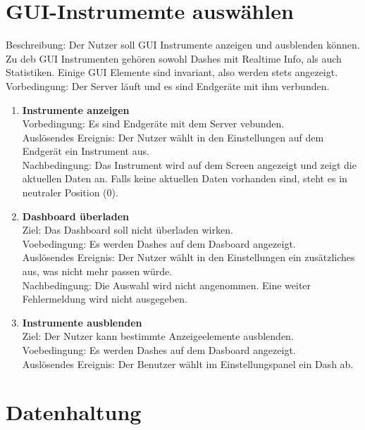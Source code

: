 \documentclass[pflichtenheft.tex]{subfiles}
\begin{document}
	\section{\textbf{GUI-Instrumemte auswählen}}
	Beschreibung: Der Nutzer soll GUI Instrumente anzeigen und ausblenden können. Zu deb GUI Instrumenten gehören sowohl Dashes mit Realtime Info, als auch Statistiken. Einige GUI Elemente sind invariant, also werden stets angezeigt. \\Vorbedingung: Der Server läuft und es sind Endgeräte mit ihm verbunden.
	
	\begin{enumerate}
	\setcounter{enumi}{\value{enumTemp}}
		\item{\textbf{Instrumente anzeigen}} \\Vorbedingung: Es sind Endgeräte mit dem Server vebunden.\\ Auslösendes Ereignis: Der Nutzer wählt in den Einstellungen auf dem Endgerät ein Instrument aus.\\ Nachbedingung: Das Instrument wird auf dem Screen angezeigt und zeigt die aktuellen Daten an. Falls keine aktuellen Daten vorhanden sind, steht es in neutraler Position (0).
		\item{\textbf{Dashboard überladen}} \\Ziel: Das Dashboard soll nicht überladen wirken. \\ Voebedingung: Es werden Dashes auf dem Dasboard angezeigt. \\Auslösendes Ereignis: Der Nutzer wählt in den Einstellungen ein zusätzliches aus, was nicht mehr passen würde. \\Nachbedingung: Die Auswahl wird nicht angenommen. Eine weiter Fehlermeldung wird nicht ausgegeben.
		\item{\textbf{Instrumente ausblenden}} \\Ziel: Der Nutzer kann bestimmte Anzeigeelemente ausblenden. \\Voebedingung: Es werden Dashes auf dem Dasboard angezeigt. \\Auslösendes Ereignis: Der Benutzer wählt im Einstellungspanel ein Dash ab.
		\setcounter{enumTemp}{\value{enumi}}
	\end{enumerate} 
	
	\section{Datenhaltung}
\end{document}
